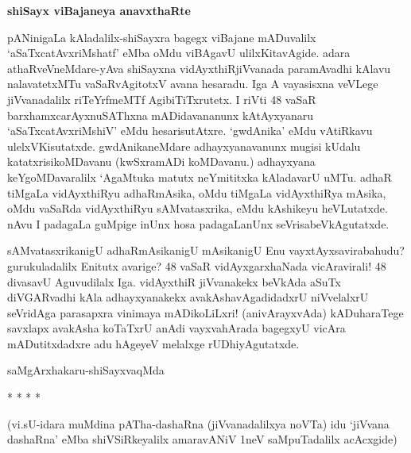 \textbf{shiSayx viBajaneya anavxthaRte}

pANinigaLa kAladalilx-shiSayxra bagegx viBajane mADuvalilx `aSaTxcatAvxriMshatf' eMba oMdu viBAgavU ulilxKitavAgide. adara athaRveVneMdare-yAva shiSayxna vidAyxthiRjiVvanada paramAvadhi kAlavu nalavatetxMTu vaSaRvAgitotxV avana hesaradu. Iga A vayasisxna veVLege jiVvanadalilx riTeYrfmeMTf AgibiTiTxrutetx. I riVti 48 vaSaR barxhamxcarAyxnuSAThxna mADidavananunx kAtAyxyanaru `aSaTxcatAvxriMshiV' eMdu hesarisutAtxre. `gwdAnika' eMdu vAtiRkavu ulelxVKisutatxde. gwdAnikaneMdare adhayxyanavanunx mugisi kUdalu katatxrisikoMDavanu (kwSxramADi koMDavanu.) adhayxyana keYgoMDavaralilx `AgaMtuka matutx neYmititxka kAladavarU uMTu. adhaR tiMgaLa vidAyxthiRyu adhaRmAsika, oMdu tiMgaLa vidAyxthiRya mAsika, oMdu vaSaRda vidAyxthiRyu sAMvatasxrika, eMdu kAshikeyu heVLutatxde. nAvu I padagaLa guMpige inUnx hosa padagaLanUnx seVrisabeVkAgutatxde.

sAMvatasxrikanigU adhaRmAsikanigU mAsikanigU Enu vayxtAyxsavirabahudu? gurukuladalilx Enitutx avarige? 48 vaSaR vidAyxgarxhaNada vicAravirali! 48 divasavU Aguvudilalx Iga. vidAyxthiR jiVvanakekx beVkAda aSuTx diVGARvadhi kAla adhayxyanakekx avakAshavAgadidadxrU niVvelalxrU seVridAga parasapxra vinimaya mADikoLiLxri! (anivArayxvAda) kADuharaTege savxlapx avakAsha koTaTxrU anAdi vayxvahArada bagegxyU vicAra mADutitxdadxre adu hAgeyeV melalxge rUDhiyAgutatxde. 

\begin{flushright}
saMgArxhakaru-shiSayxvaqMda
\end{flushright}


\begin{center}
* * * *
\end{center}

(vi.sU-idara muMdina pATha-dashaRna (jiVvanadalilxya noVTa) idu `jiVvana dashaRna' eMba shiVSiRkeyalilx amaravANiV 1neV saMpuTadalilx acAcxgide)
